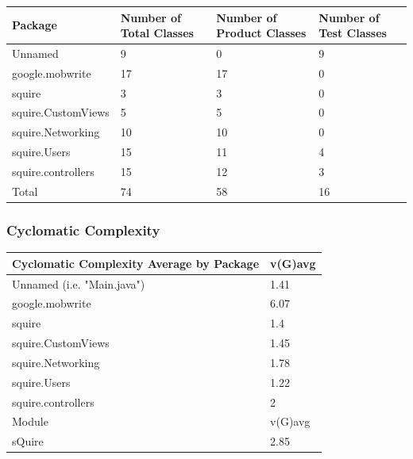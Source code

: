 \documentclass[twoside,letterpaper]{article}
\begin{document}
\begin{tabular}{|p{4cm}|p{3cm}|p{3cm}|p{3cm}|}
\hline
Package                      & Number of Total Classes & Number of Product Classes & Number of Test Classes \\ \hline
Unnamed                     & 9                       & 0                        & 9                      \\ \hline
google.mobwrite              & 17                      & 17                       & 0                      \\ \hline
squire                       & 3                       & 3                        & 0                      \\ \hline
squire.CustomViews           & 5                       & 5                        & 0                      \\ \hline
squire.Networking            & 10                      & 10                       & 0                      \\ \hline
squire.Users                 & 15                      & 11                       & 4                      \\ \hline
squire.controllers           & 15                      & 12                       & 3                      \\ \hline
Total                       & 74                      & 58                       & 16                     \\ \hline
\end{tabular}

\subsubsection{ Cyclomatic Complexity	}
\begin{flushleft}

\begin{tabular}{|l|l|}
\hline
Cyclomatic Complexity Average by Package & v(G)avg \\ \hline
Unnamed (i.e. "Main.java")               & 1.41    \\ \hline
google.mobwrite                          & 6.07    \\ \hline
squire                                   & 1.4     \\ \hline
squire.CustomViews                       & 1.45    \\ \hline
squire.Networking                        & 1.78    \\ \hline
squire.Users                             & 1.22    \\ \hline
squire.controllers                       & 2       \\ \hline
Module                                   & v(G)avg \\ \hline
sQuire                                   & 2.85    \\ \hline
\end{tabular}
\end{flushleft}
\end{document}
